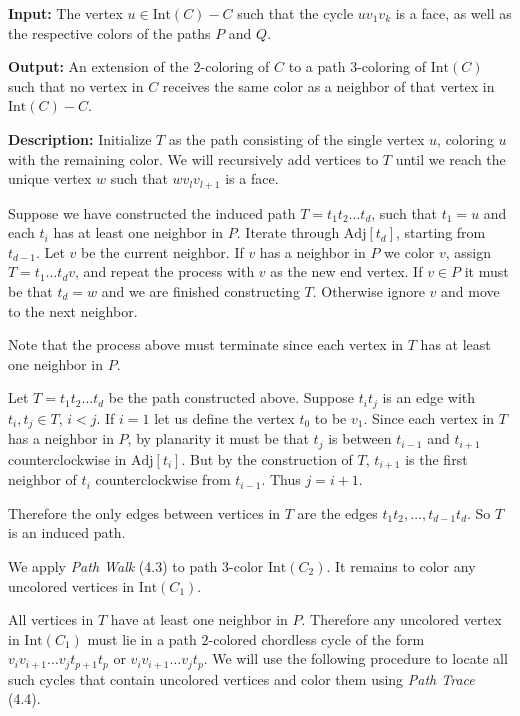 \documentclass[letterpaper, 12pt]{article}
\theoremstyle{thm}
\begin{document}
\noindent\textbf{Input:} The vertex $u\in \text{Int}(C)-C$ such that the cycle
$uv_1v_k$ is a face, as well as the respective colors of the paths $P$ and $Q$.

\noindent\textbf{Output:} An extension of the $2$-coloring of $C$ to a
path $3$-coloring of $\text{Int}(C)$ such that no vertex in $C$ receives the same
color as a neighbor of that vertex in $\text{Int}(C)-C$.

\noindent\textbf{Description:} Initialize $T$ as the path consisting of the
single vertex $u$, coloring $u$ with the remaining color. We will recursively
add vertices to $T$ until we reach the unique vertex $w$ such that $wv_lv_{l+1}$
is a face.

Suppose we have constructed the induced path $T=t_1t_2\ldots t_d$, such that
$t_1=u$ and each $t_i$ has at least one neighbor in $P$.
Iterate through $\text{Adj}[t_d]$,
starting from $t_{d-1}$. Let $v$ be the current neighbor. If $v$ has a neighbor
in $P$ we color $v$, assign $T=t_1\ldots t_dv$, and repeat the process with $v$ as
the new end vertex. If $v\in P$ it must be that $t_d=w$ and we are finished
constructing $T$. Otherwise ignore $v$ and move to the next neighbor.

Note that the process above must terminate since each vertex in $T$ has at least
one neighbor in $P$.

Let $T=t_1t_2\ldots t_d$ be the path constructed above. Suppose $t_it_j$ is an
edge with $t_i,t_j\in T$, $i<j$. If $i=1$ let us define the vertex $t_0$ to be
$v_1$. Since each vertex in $T$ has a neighbor in
$P$, by planarity it must be that $t_j$ is between $t_{i-1}$ and $t_{i+1}$
counterclockwise in $\text{Adj}[t_i]$. But by the construction of
$T$, $t_{i+1}$ is the first neighbor of $t_i$ counterclockwise from $t_{i-1}$.
Thus $j=i+1$.

Therefore the only edges between vertices in $T$ are the edges $t_1t_2,\ldots,
t_{d-1}t_d$. So $T$ is an induced path.

We apply \textit{Path Walk} (4.3) to path $3$-color $\text{Int}(C_2)$. It remains
to color any uncolored vertices in $\text{Int}(C_1)$.

All vertices in $T$ have at least one neighbor in $P$. Therefore any uncolored
vertex in $\text{Int}(C_1)$ must lie in a path $2$-colored chordless cycle of
the form $v_iv_{i+1}\ldots v_jt_{p+1}t_p$ or $v_iv_{i+1}\ldots v_jt_p$.
We will use the following procedure to locate all such cycles that contain
uncolored vertices and color them using \textit{Path Trace} (4.4).
\end{document}

